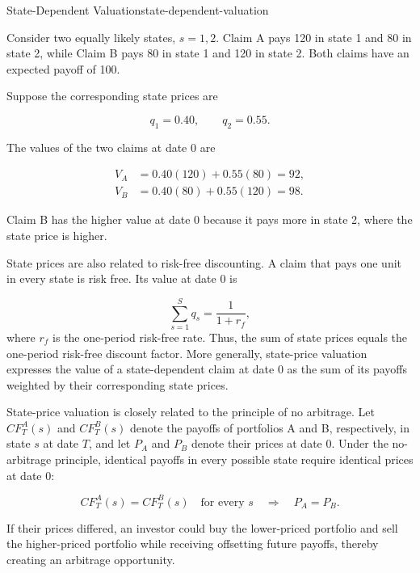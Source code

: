 \begin{example}{State-Dependent Valuation}{state-dependent-valuation}

Consider two equally likely states, $s=1,2$. Claim A pays 120 in state 1 and 80 in state 2, while Claim B pays 80 in state 1 and 120 in state 2. Both claims have an expected payoff of 100.

Suppose the corresponding state prices are

$$
q_{1}=0.40,
\qquad
q_{2}=0.55.
$$

The values of the two claims at date 0 are

\begin{align}
V_A
&=
0.40(120)+0.55(80)=92,\\
V_B
&=0.40(80)+0.55(120)=98.
\end{align}

Claim B has the higher value at date 0 because it pays more in state 2, where the state price is higher.

\end{example}

State prices are also related to risk-free discounting. A claim that pays one unit in every state is risk free. Its  value at date 0 is

\begin{equation}
\sum_{s=1}^{S}q_s=\frac{1}{1+r_f},
\label{eq:ch5-state-price-riskfree}
\end{equation}
where $r_f$ is the one-period risk-free rate. Thus, the sum of state prices equals the one-period risk-free discount factor. More generally, state-price valuation expresses the value of a state-dependent claim at date 0 as the sum of its payoffs weighted by their corresponding state prices.

State-price valuation is closely related to the principle of no arbitrage. Let $CF_T^A(s)$ and $CF_T^B(s)$ denote the payoffs of portfolios A and B, respectively, in state $s$ at date $T$, and let $P_A$ and $P_B$ denote their prices at date 0. Under the no-arbitrage principle, identical payoffs in every possible state require identical prices at date 0:

\begin{equation}
CF_T^A(s)=CF_T^B(s)
\quad \text{for every } s
\quad \Longrightarrow \quad
P_A=P_B.
\label{eq:ch5-law-one-price}
\end{equation}

If their prices differed, an investor could buy the lower-priced portfolio and sell the higher-priced portfolio while receiving offsetting future payoffs, thereby creating an arbitrage opportunity.

